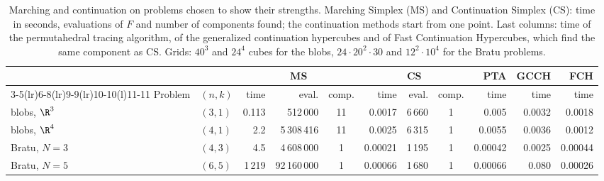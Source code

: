 \begin{table}[t]
\caption{Marching and continuation on problems chosen to show their strengths. Marching Simplex (MS) and Continuation
Simplex (CS): time in seconds, evaluations of $F$ and number of components found; the continuation methods start from one
point. Last columns: time of the permutahedral tracing algorithm, of the generalized continuation hypercubes and of
Fast Continuation Hypercubes, which find the same component as CS. Grids: $40^3$ and $24^4$ cubes for the blobs,
$24\cdot20^2\cdot30$ and $12^2\cdot10^4$ for the Bratu problems.}
\label{tab:cmp:strengths}
\centering\footnotesize\setlength{\tabcolsep}{2.2pt}
\begin{tabular}{@{}llrrcrrcrrr@{}}
\toprule
& & \multicolumn{3}{c}{MS} & \multicolumn{3}{c}{CS} & PTA & GCCH & FCH\\
\cmidrule(lr){3-5}\cmidrule(lr){6-8}\cmidrule(lr){9-9}\cmidrule(lr){10-10}\cmidrule(l){11-11}
Problem & $(n,k)$ & time & eval. & comp. & time & eval. & comp. & time & time & time\\
\midrule
blobs, $\R^3$ & $(3,1)$ & 0.113 & 512\,000 & 11 & 0.0017 & 6\,660 & 1 & 0.005 & 0.0032 & 0.0018\\
blobs, $\R^4$ & $(4,1)$ & 2.2 & 5\,308\,416 & 11 & 0.0025 & 6\,315 & 1 & 0.0055 & 0.0036 & 0.0012\\
Bratu, $N=3$ & $(4,3)$ & 4.5 & 4\,608\,000 & 1 & 0.00021 & 1\,195 & 1 & 0.00042 & 0.0025 & 0.00044\\
Bratu, $N=5$ & $(6,5)$ & 1\,219 & 92\,160\,000 & 1 & 0.00066 & 1\,680 & 1 & 0.00066 & 0.080 & 0.00026\\
\bottomrule
\end{tabular}
\end{table}
